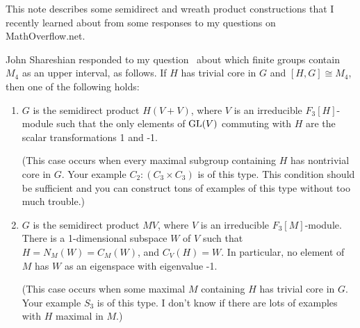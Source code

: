 This note describes some semidirect and wreath product constructions that I
recently learned about from some responses to my questions on MathOverflow.net.

John Shareshian responded to my question~\cite{MO63675} about which finite
groups contain $M_4$ as an upper interval, as follows.
If $H$ has trivial core in $G$ and $[H,G]\cong M_4$, then one of the following holds:
\begin{enumerate}
\item 
$G$ is the semidirect product $H(V+V)$, where $V$ is an irreducible
$F_3[H]$-module such that the only elements of $\mathrm{GL}(V)$ commuting with $H$ are
the scalar transformations 1 and -1. 

(This case occurs when every maximal subgroup containing $H$ has nontrivial core
in $G$. Your example $C_2:(C_3\times C_3)$ is of this type. This condition
should be sufficient and you can construct tons of examples of this type without
too much trouble.) 

\item $G$ is the semidirect product $MV$, where $V$ is an irreducible
  $F_3[M]$-module. There is a 1-dimensional subspace $W$ of $V$ such that
  $H=N_M(W)=C_M(W)$, and $C_V(H)=W$. In particular, no element of $M$ has $W$ as an
  eigenspace with eigenvalue -1. 

(This case occurs when some maximal $M$ containing $H$ has trivial core in $G$. Your
example $S_3$ is of this type. I don't know if there are lots of examples with $H$
maximal in $M$.) 
\end{enumerate}


